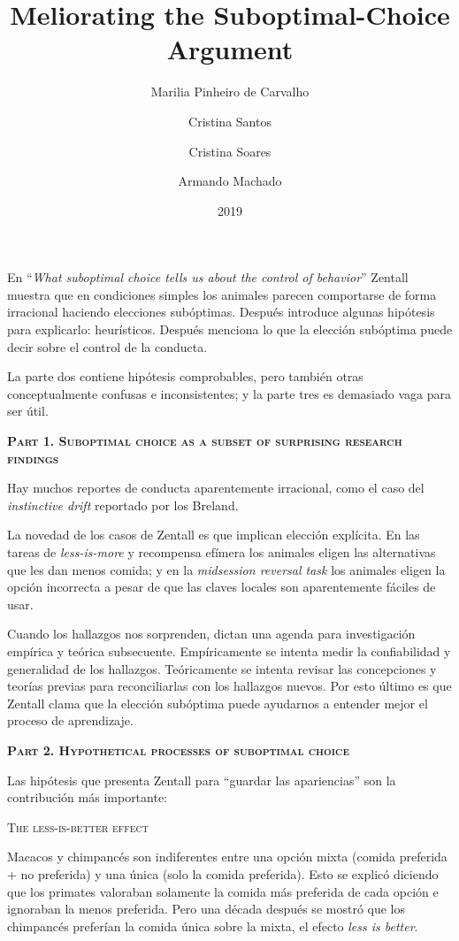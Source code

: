 \documentclass[a4paper,12pt]{article}
\title{Meliorating the Suboptimal-Choice Argument}
\author{Marilia Pinheiro de Carvalho\and Cristina Santos\and Cristina Soares\and Armando Machado}
\date{2019}
\begin{document}
{\scshape\bfseries \maketitle}

En ``{\itshape What suboptimal choice tells us about the control of behavior}'' Zentall muestra que en condiciones simples los animales parecen comportarse de forma irracional haciendo elecciones subóptimas. Después introduce algunas hipótesis para explicarlo: heurísticos. Después menciona lo que la elección subóptima puede decir sobre el control de la conducta.

La parte dos contiene hipótesis comprobables, pero también otras conceptualmente confusas e inconsistentes; y la parte tres es demasiado vaga para ser útil.

{\scshape\bfseries Part 1. Suboptimal choice as a subset of surprising research findings}

Hay muchos reportes de conducta aparentemente irracional, como el caso del {\itshape instinctive drift} reportado por los Breland.

La novedad de los casos de Zentall es que implican elección explícita. En las tareas de {\itshape less-is-more} y recompensa efímera los animales eligen las alternativas que les dan menos comida; y en la {\itshape midsession reversal task} los animales eligen la opción incorrecta a pesar de que las claves locales son aparentemente fáciles de usar.

Cuando los hallazgos nos sorprenden, dictan una agenda para investigación empírica y teórica subsecuente. Empíricamente se intenta medir la confiabilidad y generalidad de los hallazgos. Teóricamente se intenta revisar las concepciones y teorías previas para reconciliarlas con los hallazgos nuevos. Por esto último es que Zentall clama que la elección subóptima puede ayudarnos a entender mejor el proceso de aprendizaje.

{\scshape\bfseries Part 2. Hypothetical processes of suboptimal choice}

Las hipótesis que presenta Zentall para ``guardar las apariencias'' son la contribución más importante:

{\scshape The less-is-better effect}

Macacos y chimpancés son indiferentes entre una opción mixta (comida preferida + no preferida) y una única (solo la comida preferida). Esto se explicó diciendo que los primates valoraban solamente la comida más preferida de cada opción e ignoraban la menos preferida. Pero una década después se mostró que los chimpancés preferían la comida única sobre la mixta, el efecto {\itshape less is better}.
\end{document}
